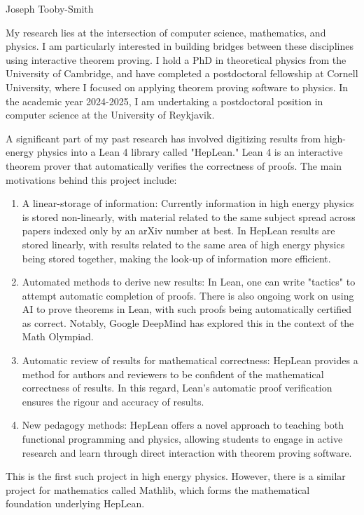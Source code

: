 \documentclass[12pt,letter]{article}
\newcounter{customtitle}
\begin{document}
\vspace{-1cm}
\begin{flushright}
{{\Large \color{white}Joseph Tooby-Smith }}
\end{flushright}
\vspace{0.4cm}

\noindent My research lies at the intersection of computer science, mathematics, and physics. I am particularly interested in building bridges between these disciplines using interactive theorem proving. I hold a PhD in theoretical physics from the University of Cambridge, and have completed a postdoctoral fellowship at Cornell University, where I focused on applying theorem proving software to physics. In the academic year 2024-2025, I am undertaking a postdoctoral position in computer science at the University of Reykjavik.

A significant part of my past research has involved digitizing results from high-energy physics into a Lean 4 library called "HepLean." Lean 4 is an interactive theorem prover that automatically verifies the correctness of proofs. The main motivations behind this project include:
\begin{enumerate}
\item A linear-storage of information: Currently information in high energy physics is stored non-linearly, with material related to the same subject spread across papers indexed only by an arXiv number at best. In HepLean results are stored linearly, with results related to the same area of high energy physics being stored together, making the look-up of information more efficient.
\item Automated methods to derive new results:  In Lean, one can write "tactics" to attempt automatic completion of proofs. There is also ongoing work on using AI to prove theorems in Lean, with such proofs being automatically certified as correct. Notably, Google DeepMind has explored this in the context of the Math Olympiad.
\item Automatic review of results for mathematical correctness: HepLean provides a method for authors and reviewers to be confident of the mathematical correctness of results. In this regard, Lean's automatic proof verification ensures the rigour and accuracy of results.
\item New pedagogy methods:	 HepLean offers a novel approach to teaching both functional programming and physics, allowing students to engage in active research and learn through direct interaction with theorem proving software.
\end{enumerate}
 This is the first such project in high energy physics. However, there is a similar project for mathematics called Mathlib, which forms the mathematical foundation underlying HepLean.
\end{document}
